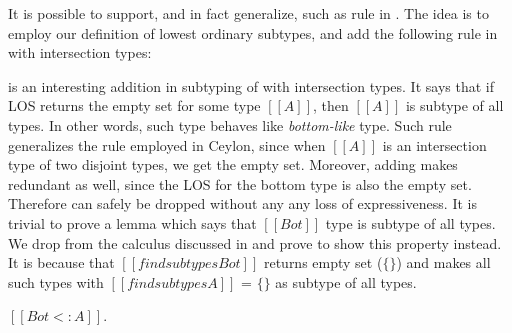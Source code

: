 \begin{center}
\end{center}

\noindent It is possible to support, and in fact generalize, such as rule in \name. The idea is to
employ our definition of lowest ordinary subtypes, and add the following rule 
in \cal with intersection types:

\begin{center}
\end{center}

\noindent {} is an interesting addition in subtyping of \cal with intersection types.
It says that if LOS returns the empty set for some type $[[A]]$, then $[[A]]$
is subtype of all types. In other words, such type behaves like \emph{bottom-like} type.
Such rule generalizes the rule employed in Ceylon, since when $[[A]]$ is an intersection type of two
disjoint types, we get the empty set.
Moreover, adding  makes  redundant as well, since the LOS for
the bottom type is also the empty set. Therefore  can safely be dropped without any
any loss of expressiveness. It is trivial to prove a lemma which says that $[[Bot]]$ type is
subtype of all types. We drop  from the calculus discussed in 
and prove  to show this property instead. It is because that $[[findsubtypes Bot]]$
returns empty set ($\{\}$) and  makes all such types with $[[findsubtypes A]]$ = $\{\}$ as
subtype of all types.

\begin{lemma}
  $[[Bot <: A]]$.
\label{lemma:discussion:bls}
\end{lemma}

